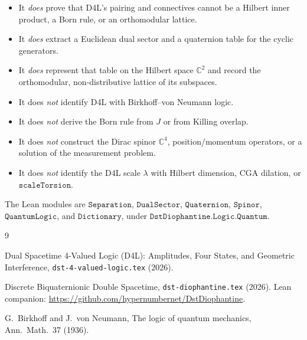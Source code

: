 \documentclass[dvipdfmx,11pt,a4paper]{article}
\theoremstyle{definition}
\theoremstyle{remark}
\begin{document}
\begin{itemize}[leftmargin=1.4em]
  \item It \emph{does} prove that D4L's pairing and connectives cannot
        be a Hilbert inner product, a Born rule, or an orthomodular
        lattice.
  \item It \emph{does} extract a Euclidean dual sector and a quaternion
        table for the cyclic generators.
  \item It \emph{does} represent that table on the Hilbert space
        $\mathbb{C}^2$ and record the orthomodular, non-distributive
        lattice of its subspaces.
  \item It does \emph{not} identify D4L with Birkhoff--von Neumann
        logic.
  \item It does \emph{not} derive the Born rule from $J$ or from
        Killing overlap.
  \item It does \emph{not} construct the Dirac spinor $\mathbb{C}^4$,
        position/momentum operators, or a solution of the measurement
        problem.
  \item It does \emph{not} identify the D4L scale $\lambda$ with
        Hilbert dimension, CGA dilation, or $\texttt{scaleTorsion}$.
\end{itemize}

The Lean modules are $\texttt{Separation}$, $\texttt{DualSector}$,
$\texttt{Quaternion}$, $\texttt{Spinor}$, $\texttt{QuantumLogic}$, and
$\texttt{Dictionary}$, under $\texttt{DstDiophantine.Logic.Quantum}$.

\begin{thebibliography}{9}
\raggedright

Dual Spacetime 4-Valued Logic (D4L): Amplitudes, Four States, and
Geometric Interference,
\texttt{dst-4-valued-logic.tex} (2026).

Discrete Biquaternionic Double Spacetime,
\texttt{dst-diophantine.tex} (2026). Lean companion:
\url{https://github.com/hypernumbernet/DstDiophantine}.

G.~Birkhoff and J.~von Neumann, The logic of quantum mechanics,
Ann.\ Math.\ 37 (1936).

\end{thebibliography}
\end{document}
